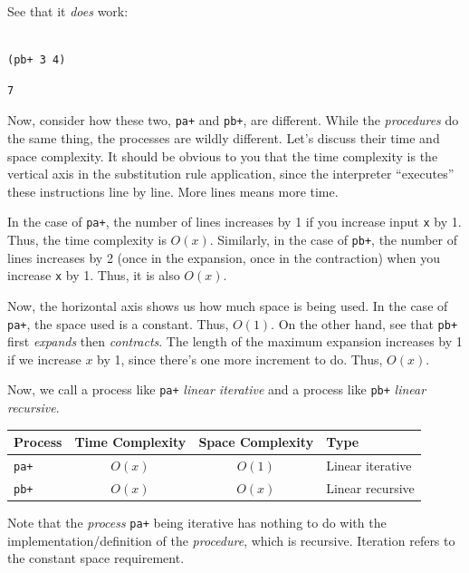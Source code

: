 \documentclass[9pt]{report}
\begin{document}
See that it \emph{does} work:

\begin{verbatim}

(pb+ 3 4)
\end{verbatim}

\begin{verbatim}
7
\end{verbatim}


Now, consider how these two, \texttt{pa+} and \texttt{pb+}, are different. While
the \emph{procedures} do the same thing, the processes are wildly
different. Let's discuss their time and space complexity.
It should be obvious to you that the time complexity is the
vertical axis in the substitution rule application, since the
interpreter ``executes'' these instructions line by line. More lines
means more time.

In the case of \texttt{pa+}, the number of lines increases by 1 if you
increase input \texttt{x} by 1. Thus, the time complexity is \(O(x)\).
Similarly, in the case of \texttt{pb+}, the number of lines increases by
2 (once in the expansion, once in the contraction) when you
increase \texttt{x} by 1. Thus, it is also \(O(x)\).

Now, the horizontal axis shows us how much space is being used. In
the case of \texttt{pa+}, the space used is a constant. Thus, \(O(1)\). On
the other hand, see that \texttt{pb+} first \emph{expands} then \emph{contracts}.
The length of the maximum expansion increases by 1 if we increase
\(x\) by 1, since there's one more increment to do. Thus, \(O(x)\).

Now, we call a process like \texttt{pa+} \emph{linear iterative} and a process
like \texttt{pb+} \emph{linear recursive}.

\begin{center}
\begin{tabular}{lccl}
\toprule
Process & Time Complexity & Space Complexity & Type\\
\midrule
\texttt{pa+} & \(O(x)\) & \(O(1)\) & Linear iterative\\
\texttt{pb+} & \(O(x)\) & \(O(x)\) & Linear recursive\\
\bottomrule
\end{tabular}
\end{center}

Note that the \emph{process} \texttt{pa+} being iterative has nothing to do
with the implementation/definition of the \emph{procedure}, which is
recursive. Iteration refers to the constant space requirement.
\end{document}
